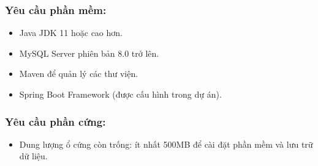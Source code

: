 \documentclass{article}
\begin{document}
\subsubsection{\textbf{Yêu cầu phần mềm}:}
\begin{itemize}
    \item Java JDK 11 hoặc cao hơn.
    \item MySQL Server phiên bản 8.0 trở lên.
    \item Maven để quản lý các thư viện.
    \item Spring Boot Framework (được cấu hình trong dự án).
\end{itemize}
\subsubsection{\textbf{Yêu cầu phần cứng}:}
\begin{itemize}

    \item Dung lượng ổ cứng còn trống: ít nhất 500MB để cài đặt phần mềm và lưu trữ dữ liệu.
\end{itemize}
\end{document}
